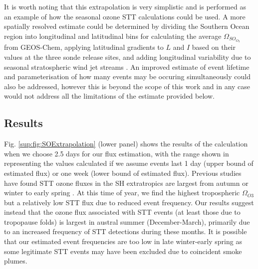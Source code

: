     It is worth noting that this extrapolation is very simplistic and is performed as an example of how the seasonal ozone STT calculations could be used.
    A more spatially resolved estimate could be determined by dividing the Southern Ocean region into longitudinal and latitudinal bins for calculating the average $\Omega_{SO_{O_3}}$ from GEOS-Chem, applying latitudinal gradients to $L$ and $I$ based on their values at the three sonde release sites, and adding longitudinal variability due to seasonal stratospheric wind jet streams \citep{Baray2012,Skerlak2015}.
    An improved estimate of event lifetime and parameterisation of how many events may be occuring simultaneously could also be addressed, however this is beyond the scope of this work and in any case would not address all the limitations of the estimate provided below.
  \subsection{Results}
    
    Fig. \ref{sup:fig:SOExtrapolation} (lower panel) shows the results of the calculation when we choose 2.5 days for our flux estimation, with the range shown in representing the values calculated if we assume events last 1 day (upper bound of estimated flux) or one week (lower bound of estimated flux).
    Previous studies have found STT ozone fluxes in the SH extratropics are largest from autumn or winter to early spring \citep{Olsen2003, Liu2016}.
    At this time of year, we find the highest tropospheric $\Omega_{O3}$ but a relatively low STT flux due to reduced event frequency.
    Our results suggest instead that the ozone flux associated with STT events (at least those due to tropopause folds) is largest in austral summer (December-March), primarily due to an increased frequency of STT detections during these months.
    It is possible that our estimated event frequencies are too low in late winter-early spring as some legitimate STT events may have been excluded due to coincident smoke plumes.
    
